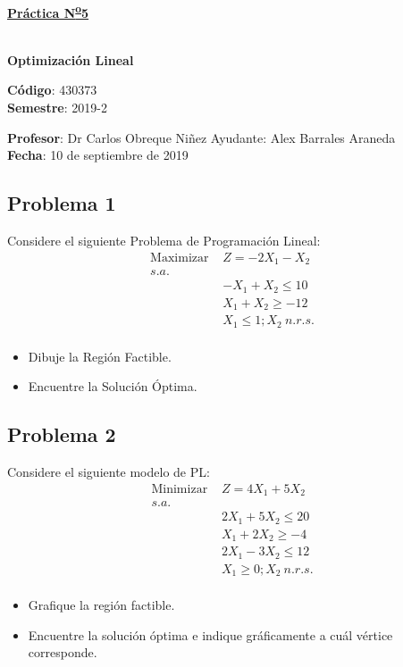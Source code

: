 \documentclass[letterpaper]{article}
\begin{document}
\vspace*{0.5\baselineskip}
\begin{center}
\begin{Large}
\textbf{\underline{Práctica N\textsuperscript{\underline{o}}5}}
\end{Large}\\
\vspace*{0.5\baselineskip}
\textbf{Optimización Lineal} \\
\vspace*{0.5\baselineskip}
\begin{footnotesize}
\textbf{Código}: 430373\\
\textbf{Semestre}: 2019-2
\end{footnotesize}
\end{center}

\noindent \textbf{Profesor}: Dr Carlos Obreque Niñez  \hfill Ayudante: Alex Barrales Araneda\\
\noindent \textbf{Fecha}: 10 de septiembre de 2019

\subsection*{Problema 1}
Considere el siguiente Problema de Programación Lineal:
\begin{align*}
\mbox{Maximizar }&Z = -2X_1 - X_2\\
s.a.\\
&-X_1 + X_2 \leq 10\\
&X_1 + X_2 \geq -12\\
&X_1 \leq 1 ; X_2\: n.r.s.\\
\end{align*}

\begin{itemize}
\item Dibuje la Región Factible.
\item Encuentre la Solución Óptima.
\end{itemize}

\subsection*{Problema 2}
Considere el siguiente modelo de PL:
\begin{align*}
\mbox{Minimizar }&Z = 4X_1 + 5X_2\\
s.a.\\
&2X_1 + 5X_2 \leq 20\\
&X_1 + 2X_2 \geq -4\\
&2X_1 - 3X_2 \leq 12\\
&X_1 \geq 0 ; X_2\: n.r.s.\\
\end{align*}
\begin{itemize}
\item Grafique la región factible.
\item Encuentre la solución óptima e indique gráficamente a cuál vértice corresponde.
\end{itemize}
\end{document}
